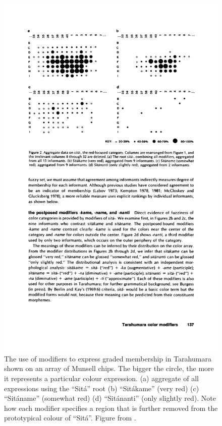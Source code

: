 \begin{figure}[htbp]
  \begin{center}
   \includegraphics[width=\textwidth]{./intro/figures/tarahumara.pdf}
   \caption[The use of modifiers in Tarahumara]{The use of modifiers
     to express graded membership in Tarahumara shown on an array of
     Munsell chips. The bigger the circle, the more it represents a
     particular colour expression. (a) aggregate of all expressions
     using the ``Sit\'a'' root (b) ``Sit\'akame'' (very red) (c)
     ``Sit\'aname'' (somewhat red) (d) ``Sit\'ananti'' (only slightly
     red). Note how each modifier specifies a region that is further
     removed from the prototypical colour of ``Sit\'a''. Figure from
     \cite{burgress83tarahumara}.}
    \label{f:tarahumara}
  \end{center}
\end{figure}


